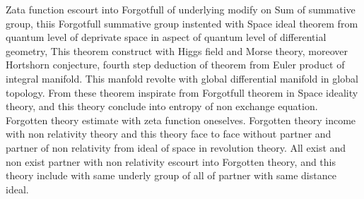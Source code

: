 \documentclass{jsarticle}
\begin{document}
   Zata function escourt into Forgotfull of underlying modify on Sum
   of summative group, thiis Forgotfull summative group instented with
   Space ideal theorem from quantum level of deprivate space in aspect
   of quantum level of differential geometry,
   This theorem construct with Higgs field and Morse theory, moreover
   Hortshorn conjecture, fourth step deduction of theorem from 
   Euler product of integral manifold.
   This manfold revolte with global differential manifold in global topology.
   From these theorem inspirate from Forgotfull theorem in Space ideality
   theory, and this theory conclude into entropy of non exchange equation.
   Forgotten theory estimate with zeta function oneselves.
   Forgotten theory income with non relativity theory and this theory
   face to face without partner and partner of non relativity from
   ideal of space in revolution theory.
   All exist and non exist partner with non relativity escourt into 
   Forgotten theory, and this theory include with same underly group
   of all of partner with same distance ideal.
\end{document}
